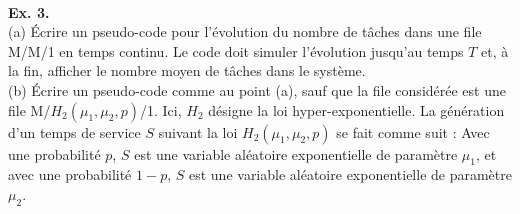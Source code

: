\documentclass[journalpaper, 12pt]{article}
\theoremstyle{definition}
\begin{document}
\begin{large}
\ \\
\noindent
{\bf Ex. 3.}
\ \\
\noindent
(a) Écrire un pseudo-code pour l’évolution du nombre de tâches dans une file M/M/1 en temps continu.
Le code doit simuler l’évolution jusqu’au temps $T$ et, à la fin, afficher le nombre moyen de tâches dans le système.
\ \\
\noindent
(b) Écrire un pseudo-code comme au point (a), sauf que la file considérée est une file M/$H_2(\mu_1,\mu_2,p)$/1.
Ici, $H_2$ désigne la loi hyper-exponentielle.
La génération d’un temps de service $S$ suivant la loi $H_2(\mu_1,\mu_2,p)$ se fait comme suit :
Avec une probabilité $p$, $S$ est une variable aléatoire exponentielle de paramètre $\mu_1$,
et avec une probabilité $1-p$, $S$ est une variable aléatoire exponentielle de paramètre $\mu_2$.

\end{large}
\end{document}
